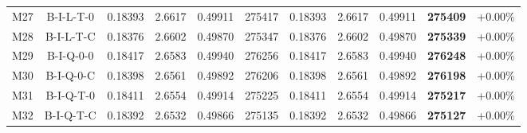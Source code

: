 \begin{table}[t]
\begin{tabular}{cc | cccc | cccc | c}
M27 & B-I-L-T-0 & 0.18393 & 2.6617 & 0.49911 & 275417 & 0.18393 & 2.6617 & 0.49911 & \textbf{275409} & +0.00\% \\
M28 & B-I-L-T-C & 0.18376 & 2.6602 & 0.49870 & 275347 & 0.18376 & 2.6602 & 0.49870 & \textbf{275339} & +0.00\% \\
M29 & B-I-Q-0-0 & 0.18417 & 2.6583 & 0.49940 & 276256 & 0.18417 & 2.6583 & 0.49940 & \textbf{276248} & +0.00\% \\
M30 & B-I-Q-0-C & 0.18398 & 2.6561 & 0.49892 & 276206 & 0.18398 & 2.6561 & 0.49892 & \textbf{276198} & +0.00\% \\
M31 & B-I-Q-T-0 & 0.18411 & 2.6554 & 0.49914 & 275225 & 0.18411 & 2.6554 & 0.49914 & \textbf{275217} & +0.00\% \\
M32 & B-I-Q-T-C & 0.18392 & 2.6532 & 0.49866 & 275135 & 0.18392 & 2.6532 & 0.49866 & \textbf{275127} & +0.00\% \\
\hline\hline
\end{tabular}
\end{table}
